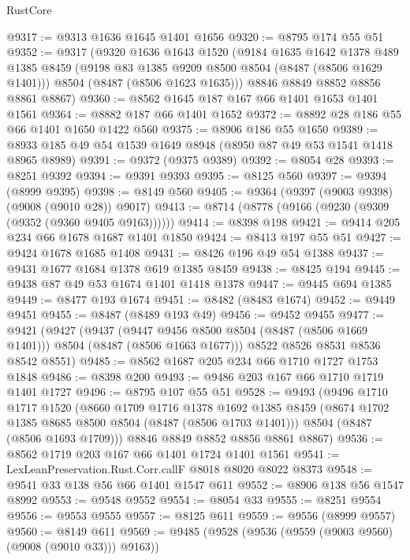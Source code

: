 \begin{lexlean}{RustCore}
\begin{coremodule}
@9317 := @9313 @1636 @1645 @1401 @1656
@9320 := @8795 @174 @55 @51
@9352 := @9317
    (@9320
      @1636
      @1643
      @1520
      (@9184
        @1635
        @1642
        @1378
        @489
        @1385
        @8459
        (@9198 @83 @1385 @9209 @8500 @8504 (@8487 (@8506 @1629 @1401)))
        @8504
        (@8487 (@8506 @1623 @1635)))
      @8846
      @8849
      @8852
      @8856
      @8861
      @8867)
@9360 := @8562 @1645 @187 @167 @66 @1401 @1653 @1401 @1561
@9364 := @8882 @187 @66 @1401 @1652
@9372 := @8892 @28 @186 @55 @66 @1401 @1650 @1422 @560
@9375 := @8906 @186 @55 @1650
@9389 := @8933 @185 @49 @54 @1539 @1649 @8948 (@8950 @87 @49 @53 @1541 @1418 @8965 @8989)
@9391 := @9372 (@9375 @9389)
@9392 := @8054 @28
@9393 := @8251 @9392
@9394 := @9391 @9393
@9395 := @8125 @560
@9397 := @9394 (@8999 @9395)
@9398 := @8149 @560
@9405 := @9364 (@9397 (@9003 @9398) (@9008 (@9010 @28)) @9017)
@9413 := @8714 (@8778 (@9166 (@9230 (@9309 (@9352 (@9360 @9405 @9163))))))
@9414 := @8398 @198
@9421 := @9414 @205 @234 @66 @1678 @1687 @1401 @1850
@9424 := @8413 @197 @55 @51
@9427 := @9424 @1678 @1685 @1408
@9431 := @8426 @196 @49 @54 @1388
@9437 := @9431 @1677 @1684 @1378 @619 @1385 @8459
@9438 := @8425 @194
@9445 := @9438 @87 @49 @53 @1674 @1401 @1418 @1378
@9447 := @9445 @694 @1385
@9449 := @8477 @193 @1674
@9451 := @8482 (@8483 @1674)
@9452 := @9449 @9451
@9455 := @8487 (@8489 @193 @49)
@9456 := @9452 @9455
@9477 := @9421
    (@9427
      (@9437
        (@9447 @9456 @8500 @8504 (@8487 (@8506 @1669 @1401)))
        @8504
        (@8487 (@8506 @1663 @1677)))
      @8522
      @8526
      @8531
      @8536
      @8542
      @8551)
@9485 := @8562 @1687 @205 @234 @66 @1710 @1727 @1753 @1848
@9486 := @8398 @200
@9493 := @9486 @203 @167 @66 @1710 @1719 @1401 @1727
@9496 := @8795 @107 @55 @51
@9528 := @9493
    (@9496
      @1710
      @1717
      @1520
      (@8660
        @1709
        @1716
        @1378
        @1692
        @1385
        @8459
        (@8674 @1702 @1385 @8685 @8500 @8504 (@8487 (@8506 @1703 @1401)))
        @8504
        (@8487 (@8506 @1693 @1709)))
      @8846
      @8849
      @8852
      @8856
      @8861
      @8867)
@9536 := @8562 @1719 @203 @167 @66 @1401 @1724 @1401 @1561
@9541 := LexLeanPreservation.Rust.Corr.callF @8018 @8020 @8022 @8373
@9548 := @9541 @33 @138 @56 @66 @1401 @1547 @611
@9552 := @8906 @138 @56 @1547 @8992
@9553 := @9548 @9552
@9554 := @8054 @33
@9555 := @8251 @9554
@9556 := @9553 @9555
@9557 := @8125 @611
@9559 := @9556 (@8999 @9557)
@9560 := @8149 @611
@9569 := @9485 (@9528 (@9536 (@9559 (@9003 @9560) (@9008 (@9010 @33))) @9163))

\end{coremodule}
\end{lexlean}

